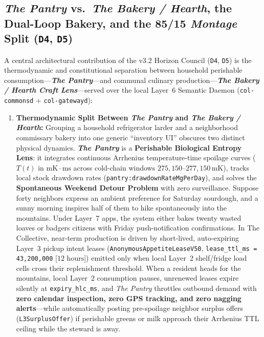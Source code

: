 \subsection{\emph{The Pantry} vs.\ \emph{The Bakery / Hearth}, the Dual-Loop Bakery, and the 85/15 \emph{Montage} Split (\texttt{D4}, \texttt{D5})}
\label{sec:gamma-dual-loop-bakery}

A central architectural contribution of the v3.2 Horizon Council (\texttt{D4}, \texttt{D5}) is the
thermodynamic and constitutional separation between household perishable consumption---\emph{\textbf{The
Pantry}}---and communal culinary production---\emph{\textbf{The Bakery / Hearth Craft Lens}}---served over
the local Layer~6 Semantic Daemon (\texttt{col-commonsd} + \texttt{col-gatewayd}):

\begin{enumerate}
    \item \textbf{Thermodynamic Split Between \emph{The Pantry} and \emph{The Bakery / Hearth}:}
    Grouping a household refrigerator larder and a neighborhood commissary bakery into one generic
    ``inventory UI'' obscures two distinct physical dynamics. \emph{\textbf{The Pantry}} is a
    \textbf{Perishable Biological Entropy Lens}: it integrates continuous Arrhenius temperature-time
    spoilage curves ($T(t)$ in $\mathrm{mK} \cdot \mathrm{ms}$ across cold-chain windows
    $275{,}150\text{--}277{,}150\,\mathrm{mK}$), tracks local stock drawdown rates
    (\texttt{pantry:drawdownRateMgPerDay}), and solves the \textbf{Spontaneous Weekend Detour Problem}
    with zero surveillance. Suppose forty neighbors express an ambient preference for Saturday sourdough,
    and a sunny morning inspires half of them to hike spontaneously into the mountains. Under Layer~7
    apps, the system either bakes twenty wasted loaves or badgers citizens with Friday push-notification
    confirmations. In The Collective, near-term production is driven by short-lived, auto-expiring Layer~3
    pickup intent leases (\texttt{AnonymousAppetiteLeaseV50}, \texttt{lease\_ttl\_ms = 43,200,000}
    [$12\text{ hours}$]) emitted only when local Layer~2 shelf/fridge load cells cross their replenishment
    threshold. When a resident heads for the mountains, local Layer~2 consumption pauses, unrenewed leases
    expire silently at \texttt{expiry\_hlc\_ms}, and \emph{The Pantry} throttles outbound demand with
    \textbf{zero calendar inspection, zero GPS tracking, and zero nagging alerts}---while automatically
    posting pre-spoilage neighbor surplus offers (\texttt{L3SurplusOffer}) if perishable greens or milk
    approach their Arrhenius TTL ceiling while the steward is away.


\end{enumerate}
